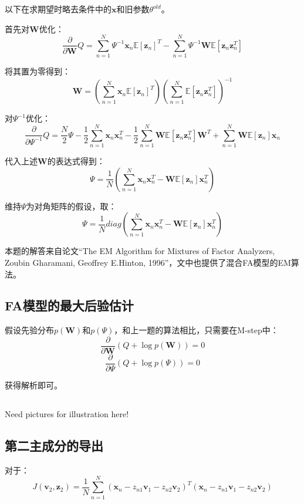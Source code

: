 \documentclass[UTF8]{ctexart}
\begin{document}
以下在求期望时略去条件中的$\textbf{x}$和旧参数$\theta^{old}$。

首先对$\textbf{W}$优化：
$$\frac{\partial}{\partial \textbf{W}}Q=\sum_{n=1}^{N}\Psi^{-1}\textbf{x}_{n}\mathbb{E}[\textbf{z}_{n}]^{T}-\sum_{n=1}^{N}\Psi^{-1}\textbf{W}\mathbb{E}[\textbf{z}_{n}\textbf{z}_{n}^{T}]$$

将其置为零得到：
$$\textbf{W}=(\sum_{n=1}^{N}\textbf{x}_{n}\mathbb{E}[\textbf{z}_{n}]^{T})(\sum_{n=1}^{N}\mathbb{E}[\textbf{z}_{n}\textbf{z}_{n}^{T}])^{-1}$$

对$\Psi^{-1}$优化：
$$\frac{\partial}{\partial \Psi^{-1}}Q=\frac{N}{2}\Psi -\frac{1}{2}\sum_{n=1}^{N}\textbf{x}_{n}\textbf{x}_{n}^{T}-\frac{1}{2}\sum_{n=1}^{N}\textbf{W}\mathbb{E}[\textbf{z}_{n}\textbf{z}_{n}^{T}]\textbf{W}^{T}+\sum_{n=1}^{N}\textbf{W}\mathbb{E}[\textbf{z}_{n}]\textbf{x}_{n}$$

代入上述$\textbf{W}$的表达式得到：
$$\Psi=\frac{1}{N}(\sum_{n=1}^{N}\textbf{x}_{n}\textbf{x}_{n}^{T}-\textbf{W}\mathbb{E}[\textbf{z}_{n}]\textbf{x}_{n}^{T})$$

维持$\Psi$为对角矩阵的假设，取：
$$\Psi=\frac{1}{N}diag(\sum_{n=1}^{N}\textbf{x}_{n}\textbf{x}_{n}^{T}-\textbf{W}\mathbb{E}[\textbf{z}_{n}]\textbf{x}_{n}^{T})$$

本题的解答来自论文“The EM Algorithm for Mixtures of Factor Analyzers, Zoubin Gharamani, Geoffrey E.Hinton, 1996”，文中也提供了混合FA模型的EM算法。

\subsection{FA模型的最大后验估计}
假设先验分布$p(\textbf{W})$和$p(\Psi)$，和上一题的算法相比，只需要在M-step中：
$$\frac{\partial}{\partial \textbf{W}}(Q+\log p(\textbf{W}))=0$$
$$\frac{\partial}{\partial \Psi}(Q+\log p(\Psi))=0$$

获得解析即可。

\subsection{}
Need pictures for illustration here!

\subsection{第二主成分的导出}
对于：
$$J(\textbf{v}_{2},\textbf{z}_{2})=\frac{1}{N}\sum_{n=1}^{N}(\textbf{x}_{n}-z_{n1}\textbf{v}_{1}-z_{n2}\textbf{v}_{2})^{T}(\textbf{x}_{n}-z_{n1}\textbf{v}_{1}-z_{n2}\textbf{v}_{2})$$
\end{document}
